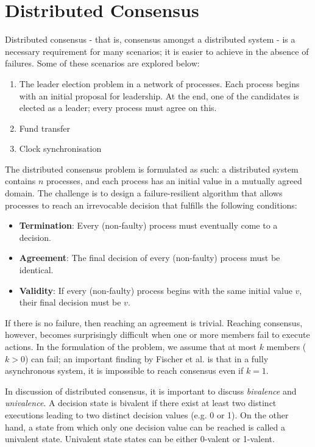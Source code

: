 \section{Distributed Consensus}
Distributed consensus - that is, consensus amongst a distributed system - is a necessary requirement for many scenarios; it is easier to achieve in the absence of failures. Some of these scenarios are explored below: \begin{enumerate}
\item The leader election problem in a network of processes. Each process begins with an initial proposal for leadership. At the end, one of the candidates is elected as a leader; every process must agree on this.
\item Fund transfer
\item Clock synchronisation 
\end{enumerate}

The distributed consensus problem is formulated as such: a distributed system contains $n$ processes, and each process has an initial value in a mutually agreed domain. The challenge is to design a failure-resilient algorithm that allows processes to reach an irrevocable decision that fulfills the following conditions: \begin{itemize}
\item \textbf{Termination}: Every (non-faulty) process must eventually come to a decision.
\item \textbf{Agreement}: The final decision of every (non-faulty) process must be identical.
\item \textbf{Validity}: If every (non-faulty) process begins with the same initial value $v$, their final decision must be $v$. 
\end{itemize}

If there is no failure, then reaching an agreement is trivial. Reaching consensus, however, becomes surprisingly difficult when one or more members fail to execute actions. In the formulation of the problem, we assume that at most $k$ members ($k>0$) can fail; an important finding by Fischer et al. is that in a fully asynchronous system, it is impossible to reach consensus even if $k=1$. 

In discussion of distributed consensus, it is important to discuss \textit{bivalence} and \textit{univalence}. A decision state is bivalent if there exist at least two distinct executions leading to two distinct decision values (e.g. 0 or 1). On the other hand, a state from which only one decision value can be reached is called a univalent state. Univalent state states can be either 0-valent or 1-valent.

